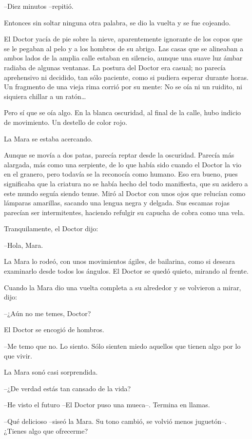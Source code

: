 --Diez minutos --repitió.

Entonces sin soltar ninguna otra palabra, se dio la vuelta y se fue cojeando.



El Doctor yacía de pie sobre la nieve, aparentemente ignorante de los copos que se le pegaban al pelo y a los hombros de su abrigo. Las casas que se alineaban a ambos lados de la amplia calle estaban en silencio, aunque una suave luz ámbar radiaba de algunas ventanas. La postura del Doctor era casual; no parecía aprehensivo ni decidido, tan sólo paciente, como si pudiera esperar durante horas. Un fragmento de una vieja rima corrió por su mente: No se oía ni un ruidito, ni siquiera chillar a un ratón…

Pero sí que se oía algo. En la blanca oscuridad, al final de la calle, hubo indicio de movimiento. Un destello de color rojo.

La Mara se estaba acercando.

Aunque se movía a dos patas, parecía reptar desde la oscuridad. Parecía más alargada, más como una serpiente, de lo que había sido cuando el Doctor la vio en el granero, pero todavía se la reconocía como humano. Eso era bueno, pues significaba que la criatura no se había hecho del todo manifiesta, que su asidero a este mundo seguía siendo tenue. Miró al Doctor con unos ojos que relucían como lámparas amarillas, sacando una lengua negra y delgada. Sus escamas rojas parecían ser intermitentes, haciendo refulgir su capucha de cobra como una vela.

Tranquilamente, el Doctor dijo:

--Hola, Mara.

La Mara lo rodeó, con unos movimientos ágiles, de bailarina, como si deseara examinarlo desde todos los ángulos. El Doctor se quedó quieto, mirando al frente.

Cuando la Mara dio una vuelta completa a su alrededor y se volvieron a mirar, dijo:

--¿Aún no me temes, Doctor?

El Doctor se encogió de hombros.

--Me temo que no. Lo siento. Sólo sienten miedo aquellos que tienen algo por lo que vivir.

La Mara sonó casi sorprendida.

--¿De verdad estás tan cansado de la vida?

--He visto el futuro --El Doctor puso una mueca--. Termina en llamas.

--Qué delicioso --siseó la Mara. Su tono cambió, se volvió menos juguetón--. ¿Tienes algo que ofrecerme?

